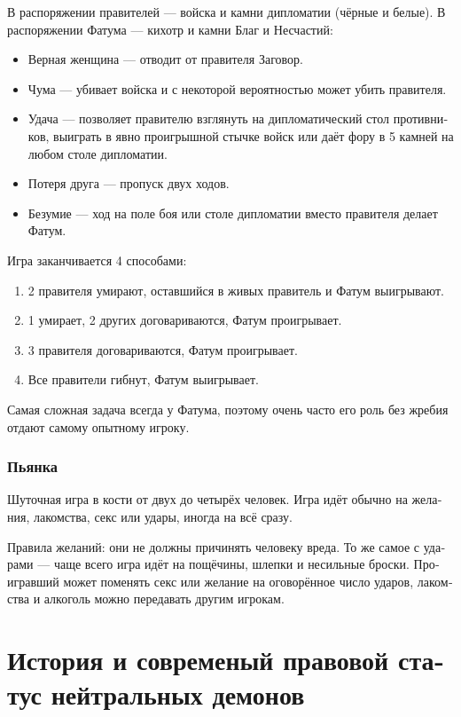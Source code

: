 \documentclass[a4paper,12pt,fleqn]{book}\usepackage{cooltooltips}\usepackage{polyglossia}\setdefaultlanguage[babelshorthands=true]{russian}\setotherlanguage{english}\defaultfontfeatures{Ligatures=TeX,Mapping=tex-text} \usepackage{xcolor}\definecolor{lightgray}{HTML}{bbbbbb}\color{lightgray}\newcommand{\ml}[3]{\textenglish{\textcolor{black}{#3}}}
\begin{document}
{В распоряжении правителей --- войска и камни дипломатии (чёрные и белые).
В распоряжении Фатума --- кихотр и камни Благ и Несчастий:

\begin{itemize}
\item Верная женщина --- отводит от правителя Заговор.
\item Чума --- убивает войска и с некоторой вероятностью может убить правителя.
\item Удача --- позволяет правителю взглянуть на дипломатический стол противников, выиграть в явно проигрышной стычке войск или даёт фору в 5 камней на любом столе
дипломатии.
\item Потеря друга --- пропуск двух ходов.
\item Безумие --- ход на поле боя или столе дипломатии вместо правителя делает Фатум.
\end{itemize}

Игра заканчивается 4 способами:

\begin{enumerate}
\item 2 правителя умирают, оставшийся в живых правитель и Фатум выигрывают.
\item 1 умирает, 2 других договариваются, Фатум проигрывает.
\item 3 правителя договариваются, Фатум проигрывает.
\item Все правители гибнут, Фатум выигрывает.
\end{enumerate}

Самая сложная задача всегда у Фатума, поэтому очень часто его роль без жребия отдают самому опытному игроку.

\subsection{Пьянка}

Шуточная игра в кости от двух до четырёх человек.
Игра идёт обычно на желания, лакомства, секс или удары, иногда на всё сразу.

Правила желаний: они не должны причинять человеку вреда.
То же самое с ударами --- чаще всего игра идёт на пощёчины, шлепки и несильные броски.
Проигравший может поменять секс или желание на оговорённое число ударов, лакомства и алкоголь можно передавать другим игрокам.

\chapter{История и современый правовой статус нейтральных демонов}

}
\end{document}
